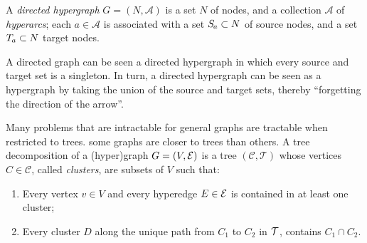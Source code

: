 \documentclass[twoside]{article}
\begin{document}
\begin{defn}
    A \emph{directed hypergraph} $G = (N, \mathcal A)$ is a set $N$ of nodes, and a collection $\mathcal A$ of \emph{hyperarcs}; each $a \in \mathcal A$ 
    is associated with a set $\Src a \subset N$ of source nodes, and a set $\Tgt a \subset N$ target nodes. 
\end{defn}
A directed graph can be seen a directed hypergraph in which every source and target set is a singleton. 
In turn, a directed hypergraph can be seen as a hypergraph
by taking the union of the source and target sets,
thereby ``forgetting the direction of the arrow''.

Many problems that are intractable for general graphs
are tractable when restricted to trees.
some graphs are closer to trees than others. 
%
A tree decomposition of a (hyper)graph $G = (V, \mathcal E)$ is a tree $(\mathcal C, \mathcal T)$ whose vertices $C \in \mathcal C$, called 
\emph{clusters}, are subsets of $V$ such that: 

\begin{enumerate}[itemsep=0pt]
    \item Every vertex $v \in V$ and every hyperedge $E \in \mathcal E$ is contained in at least one cluster;
        \item Every cluster $D$ along the unique path from $C_1$ to $C_2$ in $\cal T$,
         contains $C_1 \cap C_2$. 
\end{enumerate}
\end{document}
